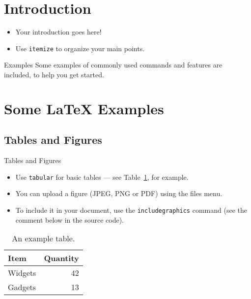 \documentclass{beamer}
\begin{document}
\section{Introduction}

\begin{frame}{}

\begin{itemize}
  \item Your introduction goes here!
  \item Use \texttt{itemize} to organize your main points.
\end{itemize}

\vskip 1cm

\begin{block}{Examples}
Some examples of commonly used commands and features are included, to help you get started.
\end{block}

\end{frame}

\section{Some \LaTeX{} Examples}

\subsection{Tables and Figures}

\begin{frame}{Tables and Figures}

\begin{itemize}
\item Use \texttt{tabular} for basic tables --- see Table~\ref{tab:widgets}, for example.
\item You can upload a figure (JPEG, PNG or PDF) using the files menu. 
\item To include it in your document, use the \texttt{includegraphics} command (see the comment below in the source code).
\end{itemize}


\begin{table}
\centering
\begin{tabular}{l|r}
Item & Quantity \\\hline
Widgets & 42 \\
Gadgets & 13
\end{tabular}
\caption{\label{tab:widgets}An example table.}
\end{table}

\end{frame}
\end{document}
